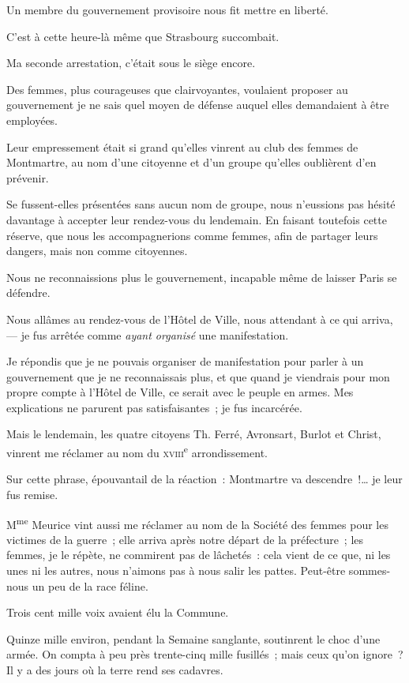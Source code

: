 \documentclass[french,twoside]{book} %
\begin{document}
Un membre du gouvernement provisoire nous fit mettre en liberté.\par
C’est à cette heure-là même que Strasbourg succombait.\par
Ma seconde arrestation, c’était sous le siège encore.\par
Des femmes, plus courageuses que clairvoyantes, voulaient proposer au gouvernement je ne sais quel moyen de défense auquel elles demandaient à être employées.\par
Leur empressement était si grand qu’elles vinrent au club des femmes de Montmartre, au nom d’une citoyenne et d’un groupe qu’elles oublièrent d’en prévenir.\par
Se fussent-elles présentées sans aucun nom de  groupe, nous n’eussions pas hésité davantage à accepter leur rendez-vous du lendemain. En faisant toutefois cette réserve, que nous les accompagnerions comme femmes, afin de partager leurs dangers, mais non comme citoyennes.\par
Nous ne reconnaissions plus le gouvernement, incapable même de laisser Paris se défendre.\par
Nous allâmes au rendez-vous de l’Hôtel de Ville, nous attendant à ce qui arriva, — je fus arrêtée comme \emph{ayant organisé} une manifestation.\par
Je répondis que je ne pouvais organiser de manifestation pour parler à un gouvernement que je ne reconnaissais plus, et que quand je viendrais pour mon propre compte à l’Hôtel de Ville, ce serait avec le peuple en armes. Mes explications ne parurent pas satisfaisantes ; je fus incarcérée.\par
Mais le lendemain, les quatre citoyens Th. Ferré, Avronsart, Burlot et Christ, vinrent me réclamer au nom du {\scshape xviii}\textsuperscript{e} arrondissement.\par
Sur cette phrase, épouvantail de la réaction : Montmartre va descendre !… je leur fus remise.\par
M\textsuperscript{me} Meurice vint aussi me réclamer au nom de la Société des femmes pour les victimes de la guerre ; elle arriva après notre départ de la préfecture ; les femmes, je le répète, ne commirent pas de lâchetés : cela vient de ce que, ni  les unes ni les autres, nous n’aimons pas à nous salir les pattes. Peut-être sommes-nous un peu de la race féline.\par
Trois cent mille voix avaient élu la Commune.\par
Quinze mille environ, pendant la Semaine sanglante, soutinrent le choc d’une armée. On compta à peu près trente-cinq mille fusillés ; mais ceux qu’on ignore ? Il y a des jours où la terre rend ses cadavres.\par
\end{document}
